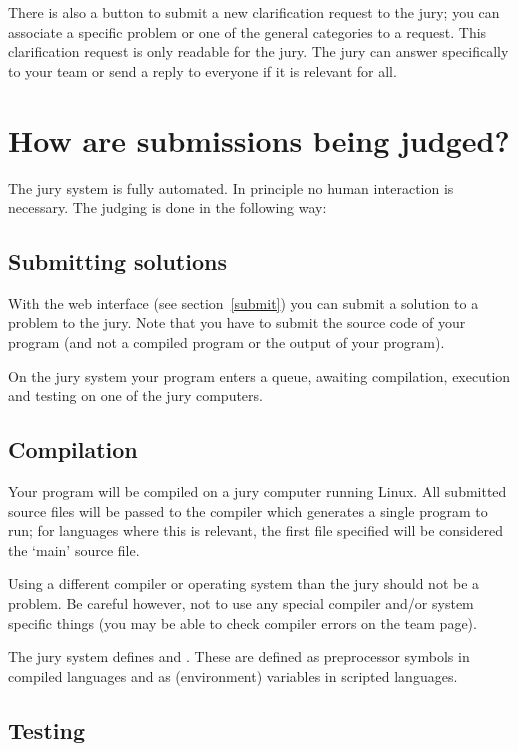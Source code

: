 There is also a button to submit a new clarification request to the
jury; you can associate a specific problem or one of the general
categories to a request. This clarification request is only readable
for the jury. The jury can answer specifically to your team or send a
reply to everyone if it is relevant for all.

\section{How are submissions being judged?}\label{howjudged}

The \DOMjudge jury system is fully automated. In principle no human
interaction is necessary. The judging is done in the following way:

\subsection{Submitting solutions}

With%
the web interface (see section~\ref{submit}) you can submit a solution
to a problem to the jury. Note that you have to submit the source code
of your program (and not a compiled program or the output of your
program).

On the jury system your program enters a queue, awaiting compilation,
execution and testing on one of the jury computers.

\subsection{Compilation}

Your program will be compiled on a jury computer running Linux.
All submitted source files will be passed to the compiler which
generates a single program to run; for languages where
this is relevant, the first file specified will be considered the
`main' source file.

Using a different compiler or operating system than the jury should
not be a problem. Be careful however, not to use any special compiler
and/or system specific things (you may be able to check compiler errors
on the team page).

The jury system defines  and .
These are defined as preprocessor symbols in compiled languages and
as (environment) variables in scripted languages.

\subsection{Testing}

